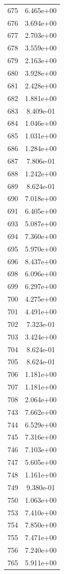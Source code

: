\documentclass[12pt]{article}
\begin{document}
\begin{longtable}{@{}cc@{}}
675 & 6.465e+00 \\
676 & 3.694e+00 \\
677 & 2.703e+00 \\
678 & 3.559e+00 \\
679 & 2.163e+00 \\
680 & 3.928e+00 \\
681 & 2.428e+00 \\
682 & 1.881e+00 \\
683 & 8.409e-01 \\
684 & 1.046e+00 \\
685 & 1.031e+00 \\
686 & 1.284e+00 \\
687 & 7.806e-01 \\
688 & 1.242e+00 \\
689 & 8.624e-01 \\
690 & 7.018e+00 \\
691 & 6.405e+00 \\
693 & 5.087e+00 \\
694 & 7.360e+00 \\
695 & 5.970e+00 \\
696 & 8.437e+00 \\
698 & 6.096e+00 \\
699 & 6.297e+00 \\
700 & 4.275e+00 \\
701 & 4.491e+00 \\
702 & 7.323e-01 \\
703 & 3.424e+00 \\
704 & 8.624e-01 \\
705 & 8.624e-01 \\
706 & 1.181e+00 \\
707 & 1.181e+00 \\
708 & 2.064e+00 \\
743 & 7.662e+00 \\
744 & 6.529e+00 \\
745 & 7.316e+00 \\
746 & 7.103e+00 \\
747 & 5.605e+00 \\
748 & 1.161e+00 \\
749 & 9.380e-01 \\
750 & 1.063e+00 \\
753 & 7.410e+00 \\
754 & 7.850e+00 \\
755 & 7.471e+00 \\
756 & 7.240e+00 \\
765 & 5.911e+00 \\

\end{longtable}
\end{document}
